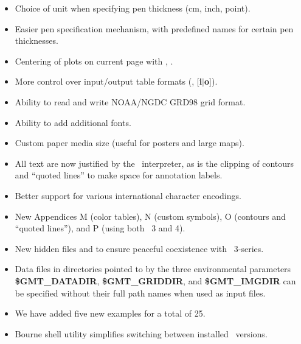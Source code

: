\begin{description}
\begin{itemize}
\item Choice of unit when specifying pen thickness (cm, inch, point).
\item Easier pen specification mechanism, with predefined names for certain pen thicknesses.
\item Centering of plots on current page with , .
\item More control over input/output table formats (, \Opt{:}[\textbf{i$|$o}]).
\item Ability to read and write NOAA/NGDC GRD98 grid format.
\item Ability to add additional fonts.
\item Custom paper media size (useful for posters and large maps).
\item All text are now justified by the \PS\ interpreter, as is the clipping of contours and ``quoted lines''
to make space for annotation labels.
\item Better support for various international character encodings.
\item New Appendices M (color tables), N (custom symbols), O (contours and ``quoted lines''), and P
(using both \GMT\ 3 and 4).
\item New hidden files  and  to ensure peaceful coexistence with \GMT\ 3-series.
\item Data files in directories pointed to by the three environmental parameters \textbf{\$GMT\_DATADIR}, \textbf{\$GMT\_GRIDDIR},
and \textbf{\$GMT\_IMGDIR} can be specified without their full path names when used as input files.
\item We have added five new examples for a total of 25.
\item Bourne shell utility  simplifies switching between installed \GMT\ versions.
\end{itemize}
\end{description}

